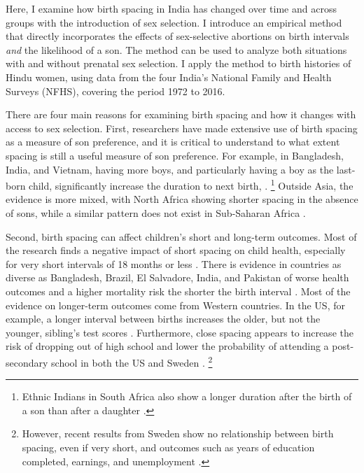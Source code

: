 \documentclass[12pt,letterpaper]{article}
\begin{document}
Here, I examine how birth spacing in India has changed over time and across 
groups with the introduction of sex selection.
I introduce an empirical method that directly incorporates the effects of 
sex-selective abortions on birth intervals
\emph{and} 
the likelihood of a son. 
The method can be used to analyze both situations with and without prenatal
sex selection.
I apply the method to birth histories of Hindu women, using data from the four
India's National Family and Health Surveys (NFHS), covering the period 
1972 to 2016. 



There are four main reasons for examining birth spacing and how it changes with 
access to sex selection.
First, researchers have made extensive use of birth spacing as a measure of son preference, 
and it is critical to understand to what extent spacing is still a useful measure of son 
preference.
For example, in Bangladesh, India, and Vietnam, having more boys, and particularly having 
a boy as the last-born child, significantly increase the duration to next birth,
\citep{Haughton1995,Haughton1996,Rahman1993,Bhalotra2008,Kumar2016,Soest2018}.%
\footnote{
Ethnic Indians in South Africa also show a longer duration after the birth of a 
son than after a daughter \citep{Gangadharan2003}.
}
Outside Asia, the evidence is more mixed, with North Africa showing shorter spacing in the 
absence of sons, while a similar pattern does not exist in Sub-Saharan Africa 
\citep{Rossi2015}.

Second, birth spacing can affect children's short and long-term outcomes.
Most of the research finds a negative impact of short spacing on child health, especially 
for very short intervals of 18 months or less \citep{Conde-Agudelo2006,Conde-Agudelo2012}.
There is evidence in countries as diverse as Bangladesh, Brazil, El Salvadore, India,
and Pakistan of worse health outcomes and a higher mortality risk the shorter the birth
interval
\citep{Cleland1984,Curtis1993,Whitworth2002,Bhargava2003,Rutstein2005,Bhalotra2008,Davanzo2008,Maitra2008,Makepeace2008,Gribble2009,Jayachandran2011,Saha2013,Jayachandran2017a,Ghosh2018}.
Most of the evidence on longer-term outcomes come from Western countries.
In the US, for example, a longer interval between births increases the older, but not the
younger, sibling's test scores \citep{Buckles2012}.
Furthermore, close spacing appears to increase the risk of dropping out of
high school and lower the probability of attending a post-secondary school in both the
US and Sweden \citep{Powell1993,Pettersson-Lidbom2009}.%
\footnote{
However, recent results from Sweden show no relationship between birth spacing, even if 
very short, and outcomes such as years of education completed, earnings, and unemployment 
\citep{Barclay2017}.
}
\end{document}
